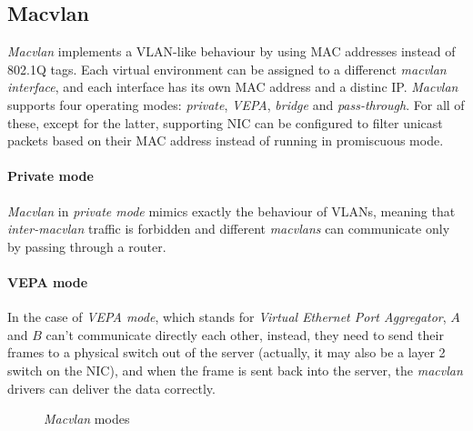 \subsection{Macvlan}
\emph{Macvlan} implements a VLAN-like behaviour by using MAC addresses instead
of 802.1Q tags. Each virtual environment can be assigned to a differenct
\emph{macvlan interface}, and each interface has its own MAC address and a
distinc IP. \emph{Macvlan} supports four operating modes: \emph{private},
\emph{VEPA}, \emph{bridge} and \emph{pass-through}. For all of these, except
for the latter, supporting NIC can be configured to filter unicast packets
based on their MAC address instead of running in promiscuous mode.

\paragraph{Private mode}
\emph{Macvlan} in \emph{private mode} mimics exactly the behaviour of VLANs,
meaning that \emph{inter-macvlan} traffic is forbidden and different
\emph{macvlans} can communicate only by passing through a router.

\paragraph{VEPA mode}
In the case of \emph{VEPA mode}, which stands for \emph{Virtual Ethernet Port
Aggregator}, $A$ and $B$ can't communicate directly each other, instead, they
need to send their frames to a physical switch out of the server (actually, it
may also be a layer 2 switch on the NIC), and when the frame is sent back into
the server, the \emph{macvlan} drivers can deliver the data correctly.

\begin{figure}[hb!]
    \centering
    \hspace{1.5cm}
    \hspace{1.5cm}
\end{figure}
\newpage
\begin{figure}[h!]
    \ContinuedFloat
    \centering
    \hspace{1.5cm}
    \caption{\emph{Macvlan} modes}
\end{figure}

